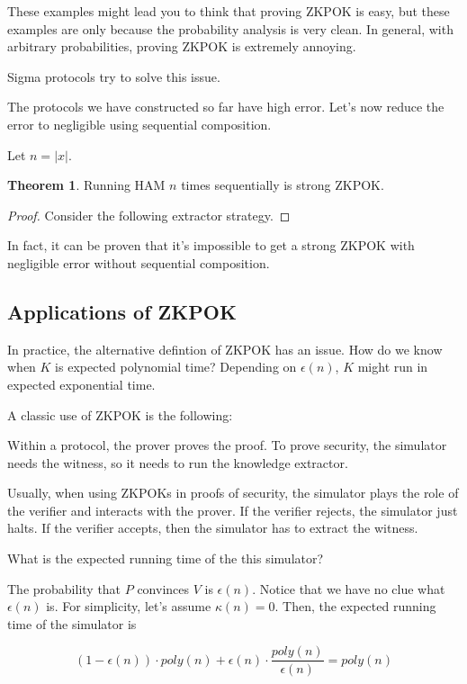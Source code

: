 \documentclass{article}
\theoremstyle{definition}
\newtheorem{theorem}{Theorem}[section]
\begin{document}
These examples might lead you to think that proving ZKPOK is easy, but these examples are
only because the probability analysis is very clean. In general, with arbitrary probabilities,
proving ZKPOK is extremely annoying.

Sigma protocols try to solve this issue.

The protocols we have constructed so far have high error. Let's now reduce the
error to negligible using sequential composition.

Let $n = \lvert x \rvert$. 

\begin{theorem}
    Running HAM $n$ times sequentially is strong ZKPOK.
\end{theorem}
\begin{proof}
    Consider the following extractor strategy.
\end{proof}

In fact, it can be proven that it's impossible to get a strong ZKPOK with negligible error
without sequential composition.

\subsection{Applications of ZKPOK}

In practice, the alternative defintion of ZKPOK has an issue. How do we know when
$K$ is expected polynomial time? Depending on $\epsilon(n)$, $K$ might run in
expected exponential time.

A classic use of ZKPOK is the following:

Within a protocol, the prover proves the proof. To prove security, the simulator needs the witness, so
it needs to run the knowledge extractor.

Usually, when using ZKPOKs in proofs of security, the simulator plays the role of the verifier
and interacts with the prover. If the verifier rejects, the simulator just halts. If the
verifier accepts, then the simulator has to extract the witness.

What is the expected running time of the this simulator?

The probability that $P$ convinces $V$ is $\epsilon(n)$. Notice that we have no clue
what $\epsilon(n)$ is. For simplicity, let's assume $\kappa(n) = 0$. Then, the expected
running time of the simulator is 

\[ (1 - \epsilon(n)) \cdot poly(n) + \epsilon(n) \cdot \frac{poly(n)}{\epsilon(n)} = poly(n)\]
\end{document}
